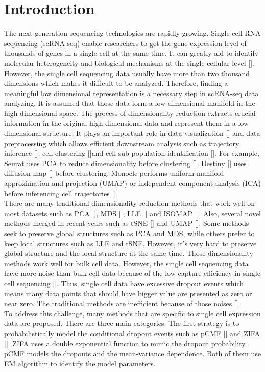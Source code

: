 \section{Introduction}
The next-generation sequencing technologies are rapidly growing. Single-cell RNA sequencing (scRNA-seq) enable researchers to get the gene expression level of thousands of genes in a single cell at the same time. It can greatly aid to identify molecular heterogeneity and biological mechanisms at the single cellular level [].\\
However, the single cell sequencing data usually have more than two thousand dimensions which makes it difficult to be analyzed. Therefore, finding a meaningful low dimensional representation is a necessary step in scRNA-seq data analyzing. It is assumed that those data form a low dimensional manifold in the high dimensional space. The process of dimensionality reduction extracts crucial information in the original high dimensional data and represent them in a low dimensional structure.  It plays an important role in data visualization [] and data preprocessing which allows efficient downstream analysis such as trajectory inference [], cell clustering []and cell sub-population identification []. For example, Seurat uses PCA to reduce dimensionality before clustering []. Destiny [] uses diffusion map [] before clustering. Monocle performs uniform manifold approximation and projection (UMAP) or independent component analysis (ICA) before inferencing cell trajectories []. \\
There are many traditional dimensionality reduction methods that work well on most datasets such as PCA [], MDS [], LLE [] and ISOMAP []. Also, several novel methods merged in recent years such as tSNE [] and UMAP []. Some methods seek to preserve global structures such as PCA and MDS, while others prefer to keep local structures such as LLE and tSNE. However, it’s very hard to preserve global structure and the local structure at the same time. 
Those dimensionality methods work well for bulk cell data. However, the single cell sequencing data have more noise than bulk cell data because of the low capture efficiency in single cell sequencing []. Thus, single cell data have excessive dropout events which means many data points that should have bigger value are presented as zero or near zero. The traditional methods are inefficient because of those noises [].  \\
To address this challenge, many methods that are specific to single cell expression data are proposed. There are three main categories. The first strategy is to probabilistically model the conditional dropout events such as pCMF [] and ZIFA []. ZIFA uses a double exponential function to mimic the dropout probability. pCMF models the dropouts and the mean-variance dependence. Both of them use EM algorithm to identify the model parameters.
